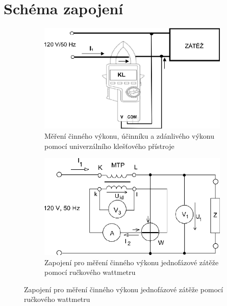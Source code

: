 \documentclass{article}
\begin{document}
\section{Schéma zapojení}
\begin{figure}[H]
	\centering
	\begin{subfigure}{0.45\linewidth}
		\centering
		\includegraphics[width=1\linewidth]{screenshot001}
		\caption{Měření činného výkonu, účinníku a zdánlivého výkonu pomocí univerzálního klešťového přístroje}
		\label{fig:screenshot001}
	\end{subfigure}
	\begin{subfigure}{0.1\linewidth}
	\end{subfigure}
	\begin{subfigure}{0.45\linewidth}
		\centering
		\includegraphics[width=1\linewidth]{screenshot002}
		\caption{Zapojení pro měření činného výkonu jednofázové zátěže pomocí ručkového wattmetru}
		\label{fig:screenshot002}
	\end{subfigure}
\end{figure}
\end{document}
